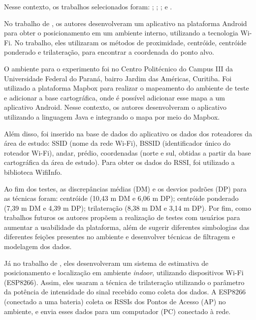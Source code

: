 \documentclass[12pt]{artigoifce}
\begin{document}
Nesse contexto, os trabalhos selecionados foram: ; ; ; e .


No trabalho de , os autores desenvolveram um aplicativo na plataforma Android para obter o posicionamento em um ambiente interno, utilizando a tecnologia Wi-Fi. No trabalho, eles utilizaram os métodos de proximidade, centróide, centróide ponderado e trilateração, para encontrar a coordenada do ponto alvo. 

O ambiente para o experimento foi no Centro Politécnico do Campus III da Universidade Federal do Paraná, bairro Jardim das Américas, Curitiba. Foi utilizado a plataforma Mapbox para realizar o mapeamento do ambiente de teste e adicionar a base cartográfica, onde é possível adicionar esse mapa a um aplicativo Android. Nesse contexto, os autores desenvolveram o aplicativo utilizando a linguagem Java e integrando o mapa por meio do Mapbox. 

Além disso, foi inserido na base de dados do aplicativo os dados dos roteadores da área de estudo: SSID (nome da rede Wi-Fi), BSSID (identificador único do roteador Wi-Fi), andar, prédio, coordenadas (norte e sul, obtidas a partir da base cartográfica da área de estudo). Para obter os dados do RSSI, foi utilizado a biblioteca WifiInfo.

Ao fim dos testes, as discrepâncias médias (DM) e os desvios padrões (DP) para as técnicas foram: centróide (10,43 m DM e 6,06 m DP); centróide ponderado (7,39 m DM e 4,39 m DP); trilateração (8,38 m DM e 3,14 m DP). Por fim, como trabalhos futuros os autores propõem a realização de testes com usuários para aumentar a usabilidade da plataforma, além de sugerir diferentes simbologias das diferentes feições presentes no ambiente e desenvolver técnicas de filtragem e modelagem dos dados.

Já no trabalho de , eles desenvolveram um sistema de estimativa de posicionamento e localização em ambiente \textit{indoor}, utilizando dispositivos Wi-Fi (ESP8266). Assim, eles usaram a técnica de trilateração utilizando o parâmetro da potência de intensidade do sinal recebido como coleta dos dados. A ESP8266 (conectado a uma bateria) coleta os RSSIs dos Pontos de Acesso (AP) no ambiente, e envia esses dados para um computador (PC) conectado à rede. 
\end{document}
